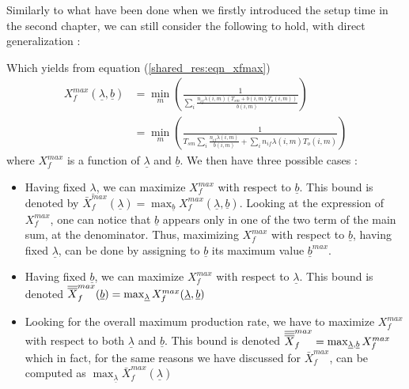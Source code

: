 Similarly to what have been done when we firstly introduced the setup time in the second chapter, we can still consider the following to hold, with direct generalization : 
\begin{center}
\end{center}
Which yields from equation (\ref{shared_res:eqn_xfmax})
\[
    \begin{split}
        X_f^{max}(\underline\lambda, \underline b)
        &= \min_m\left( \frac{1}{ \sum_i\frac{ n_{if}\lambda(i,m)(T_{sm}+b(i,m)T_o(i,m)) }{b(i,m)} } \right)\\
        &= \min_m\left( \frac{1}{T_{sm}\sum_i\frac{n_{if}\lambda(i,m)}{b(i,m)} + \sum_i n_{if}\lambda(i,m)T_o(i,m)} \right)
    \end{split}
\] where $X_f^{max}$ is a function of $\underline\lambda$ and $\underline b$. We then have three possible cases :
\begin{itemize}
    \item Having fixed $\underline\lambda$, we can maximize $X_f^{max}$ with respect to $\underline b$. This bound is denoted by $\bar X_f^{max}(\underline\lambda) = \max_{\underline b}X_f^{max}(\underline\lambda, \underline b)$. Looking at the expression of $X_f^{max}$, one can notice that $\underline b$ appears only in one of the two term of the main sum, at the denominator. Thus, maximizing $X_f^{max}$ with respect to $\underline b$, having fixed $\underline\lambda$, can be done by assigning to $\underline b$ its maximum value $\underline b^{max}$.
    \item Having fixed $\underline b$, we can maximize $X_f^{max}$ with respect to $\underline \lambda$. This bound is denoted $\overline{\overline{X}}_f^{max}(\underline b) = \max_{\underline\lambda}X_f^{max}(\underline\lambda, \underline b)$
    \item Looking for the overall maximum production rate, we have to maximize $X_f^{max}$ with respect to both $\underline\lambda$ and $\underline b$. This bound is denoted $\overline{\overline{\overline{X}}}_f^{max} = \max_{\underline\lambda, \underline b}X_f^{max}$ which in fact, for the same reasons we have discussed for $\bar X_f^{max}$, can be computed as $\max_{\underline\lambda}\bar X_f^{max}(\underline\lambda)$
\end{itemize}

